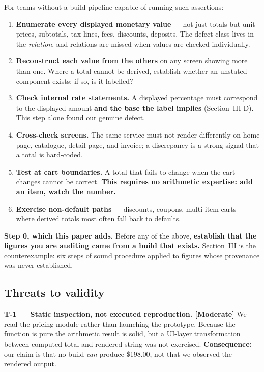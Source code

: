 \documentclass[conference]{IEEEtran}
\begin{document}
For teams without a build pipeline capable of running such assertions:
\begin{enumerate}
\item \textbf{Enumerate every displayed monetary value} --- not just totals but unit prices, subtotals,
      tax lines, fees, discounts, deposits. The defect class lives in the \emph{relation}, and relations
      are missed when values are checked individually.
\item \textbf{Reconstruct each value from the others} on any screen showing more than one. Where a total
      cannot be derived, establish whether an unstated component exists; if so, is it labelled?
\item \textbf{Check internal rate statements.} A displayed percentage must correspond to the displayed
      amount \textbf{and the base the label implies} (Section~III-D). This step alone found our
      genuine defect.
\item \textbf{Cross-check screens.} The same service must not render differently on home page, catalogue,
      detail page, and invoice; a discrepancy is a strong signal that a total is hard-coded.
\item \textbf{Test at cart boundaries.} A total that fails to change when the cart changes cannot be
      correct. \textbf{This requires no arithmetic expertise: add an item, watch the number.}
\item \textbf{Exercise non-default paths} --- discounts, coupons, multi-item carts --- where derived
      totals most often fall back to defaults.
\end{enumerate}

\textbf{Step 0, which this paper adds.} Before any of the above, \textbf{establish that the figures you
are auditing came from a build that exists.} Section~III is the counterexample: six steps of sound
procedure applied to figures whose provenance was never established.

\subsection{Threats to validity}

\textbf{T-1 --- Static inspection, not executed reproduction. [Moderate]} We read the pricing module
rather than launching the prototype. Because the function is pure the arithmetic result is solid, but a
UI-layer transformation between computed total and rendered string was not exercised.
\textbf{Consequence:} our claim is that no build \emph{can} produce \$198.00, not that we observed the
rendered output.
\end{document}
